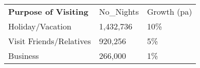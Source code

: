\begin{tabular}[t]{p{5cm}p{1.3cm}p{1.2cm}}
 \textbf{Purpose of Visiting} & No\_Nights & Growth (pa) \\ 
 Holiday/Vacation & 1,432,736 & 10\% \\ 
  Visit Friends/Relatives &   920,256 & 5\% \\ 
  Business &   266,000 & 1\% \\ 
  \end{tabular}
